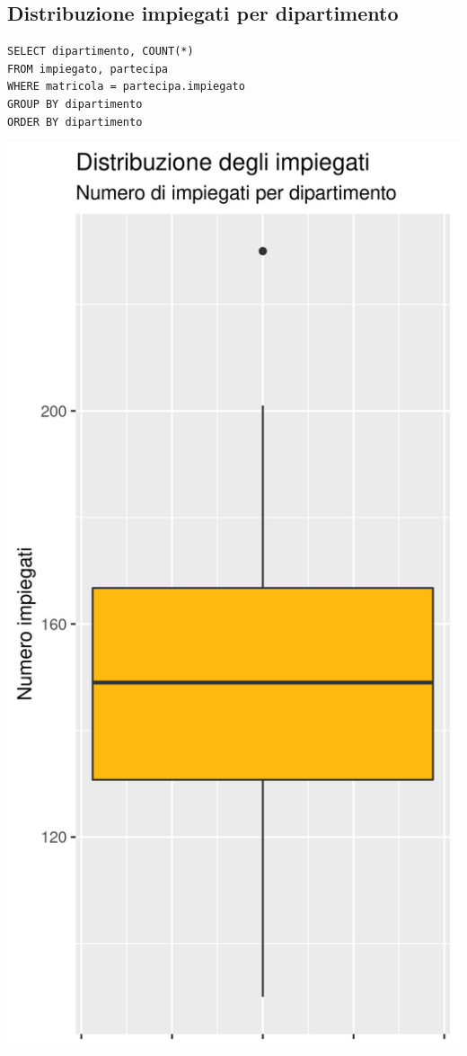 \documentclass{article}
\begin{document}
\subsection{Distribuzione impiegati per dipartimento}
\begin{verbatim}
SELECT dipartimento, COUNT(*) 
FROM impiegato, partecipa 
WHERE matricola = partecipa.impiegato 
GROUP BY dipartimento 
ORDER BY dipartimento
\end{verbatim}
\begin{center}
\includegraphics[width=.5\textwidth]{plot_dist_impiegati_dipartimento.png}
\end{center}

\newpage
\end{document}
